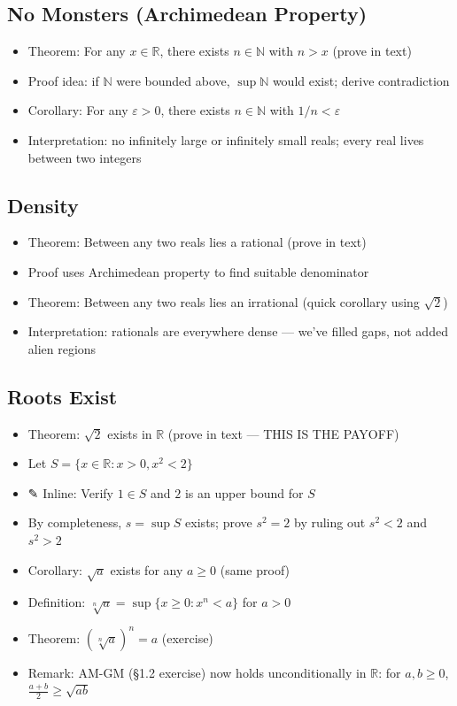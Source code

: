 \documentclass[
  10pt,
  letterpaper,
]{scrbook}
\providecommand{\tightlist}{%
  \setlength{\itemsep}{0pt}\setlength{\parskip}{0pt}}
\newcommand{\NN}{\mathbb{N}}
\newcommand{\RR}{\mathbb{R}}
\begin{document}
\subsection{No Monsters (Archimedean
Property)}\label{no-monsters-archimedean-property}

\begin{itemize}
\tightlist
\item
  Theorem: For any \(x \in \RR\), there exists \(n \in \NN\) with
  \(n > x\) (prove in text)
\item
  Proof idea: if \(\NN\) were bounded above, \(\sup \NN\) would exist;
  derive contradiction
\item
  Corollary: For any \(\varepsilon > 0\), there exists \(n \in \NN\)
  with \(1/n < \varepsilon\)
\item
  Interpretation: no infinitely large or infinitely small reals; every
  real lives between two integers
\end{itemize}

\subsection{Density}\label{density}

\begin{itemize}
\tightlist
\item
  Theorem: Between any two reals lies a rational (prove in text)
\item
  Proof uses Archimedean property to find suitable denominator
\item
  Theorem: Between any two reals lies an irrational (quick corollary
  using \(\sqrt{2}\))
\item
  Interpretation: rationals are everywhere dense --- we've filled gaps,
  not added alien regions
\end{itemize}

\subsection{Roots Exist}\label{roots-exist}

\begin{itemize}
\tightlist
\item
  Theorem: \(\sqrt{2}\) exists in \(\RR\) (prove in text --- THIS IS THE
  PAYOFF)
\item
  Let \(S = \{x \in \RR : x > 0, x^2 < 2\}\)
\item
  ✎ Inline: Verify \(1 \in S\) and \(2\) is an upper bound for \(S\)
\item
  By completeness, \(s = \sup S\) exists; prove \(s^2 = 2\) by ruling
  out \(s^2 < 2\) and \(s^2 > 2\)
\item
  Corollary: \(\sqrt{a}\) exists for any \(a \geq 0\) (same proof)
\item
  Definition: \(\sqrt[n]{a} = \sup\{x \geq 0 : x^n < a\}\) for \(a > 0\)
\item
  Theorem: \((\sqrt[n]{a})^n = a\) (exercise)
\item
  Remark: AM-GM (§1.2 exercise) now holds unconditionally in \(\RR\):
  for \(a, b \geq 0\), \(\frac{a+b}{2} \geq \sqrt{ab}\)
\end{itemize}
\end{document}
